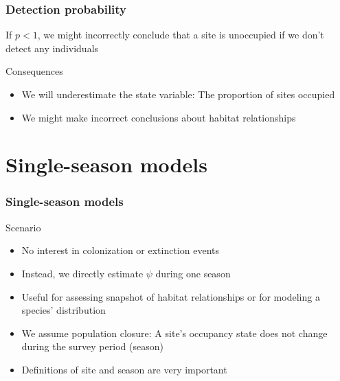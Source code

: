 \documentclass[color=usenames,dvipsnames]{beamer}\usepackage[]{graphicx}\usepackage[]{color}
\begin{document}





\begin{frame}
  \frametitle{Detection probability}
  \large
  {\centering If $p<1$, we might
    incorrectly conclude that a site is unoccupied if we don't detect
    any individuals \par}
  \pause
  \vspace{0.5cm}
  {%
    Consequences}
  \begin{itemize}[<+->]
    \item We will underestimate the state variable: The proportion of
      sites occupied
    \item We might make incorrect conclusions about habitat relationships
  \end{itemize}
\end{frame}







\section{Single-season models}




\begin{frame}
  \frametitle{Single-season models}
  \large
  {%
    Scenario}
  \large
  \begin{itemize}[<+->]
    \item No interest in colonization or extinction events
    \item Instead, we directly estimate $\psi$ during one season
    \item Useful for assessing snapshot of habitat relationships or
      for modeling a species' distribution
    \item We assume \alert{population closure}: A site's occupancy
      state does not change during the survey period (season)
    \item Definitions of site and season are very important
  \end{itemize}
\end{frame}
\end{document}
